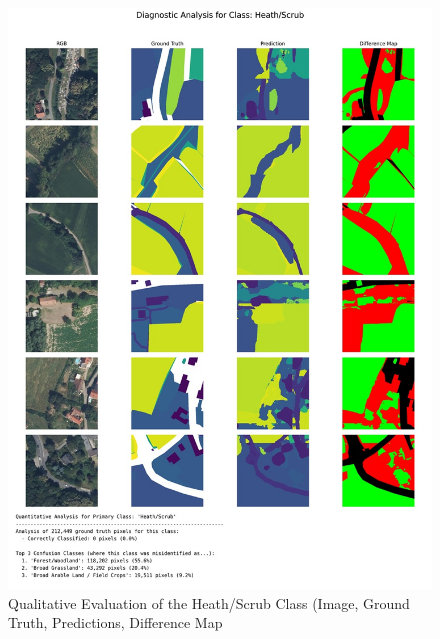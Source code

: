 \documentclass{report}
\begin{document}
\begin{figure}
    \centering
    \includegraphics[width=1.2\linewidth]{own_images/low_res_greater_100_sqm_diagnostic_12_Heath_Scrub.jpg}
    \caption{Qualitative Evaluation of the Heath/Scrub Class (Image, Ground Truth, Predictions, Difference Map}
    \label{fig:qual_eval_heath_srub}
\end{figure}
\end{document}
